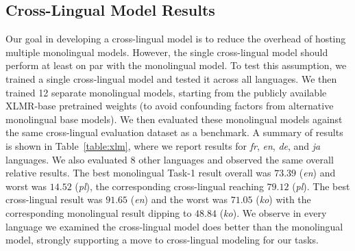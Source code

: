 \subsection*{Cross-Lingual Model Results}
Our goal in developing a cross-lingual model is to reduce the overhead of hosting multiple monolingual models.
However, the single cross-lingual model should perform at least on par with the monolingual model.
To test this assumption, we trained a single cross-lingual model and tested it across all languages.
We then trained 12 separate monolingual models, starting from the publicly available XLMR-base pretrained weights (to avoid confounding factors from alternative monolingual base models).
We then evaluated these monolingual models against the same cross-lingual evaluation dataset as a benchmark.
A summary of results is shown in Table~\ref{table:xlm}, where we report results for \emph{fr}, \emph{en}, \emph{de}, and \emph{ja} languages. 
We also evaluated 8 other languages and observed the same overall relative results. 
The best monolingual Task-1 result overall was $73.39$ (\emph{en}) and worst was $14.52$ (\emph{pl}), the corresponding cross-lingual reaching $79.12$ (\emph{pl}). 
The best cross-lingual result was $91.65$ (\emph{en}) and the worst was $71.05$ (\emph{ko}) with the corresponding monolingual result dipping to $48.84$ (\emph{ko}).
We observe in every language we examined the cross-lingual model does better than the monolingual model, strongly supporting a move to cross-lingual modeling for our tasks.


\begin{table}[!htb]
\centering
\renewcommand{\arraystretch}{1.1}
\caption{Cross-lingual model comparison with monolingual models, evaluated on the same target language.  Across all languages and tasks we evaluated, we observed the cross-lingual models to outperform monolingual models.}
\label{table:xlm}
\end{table}


